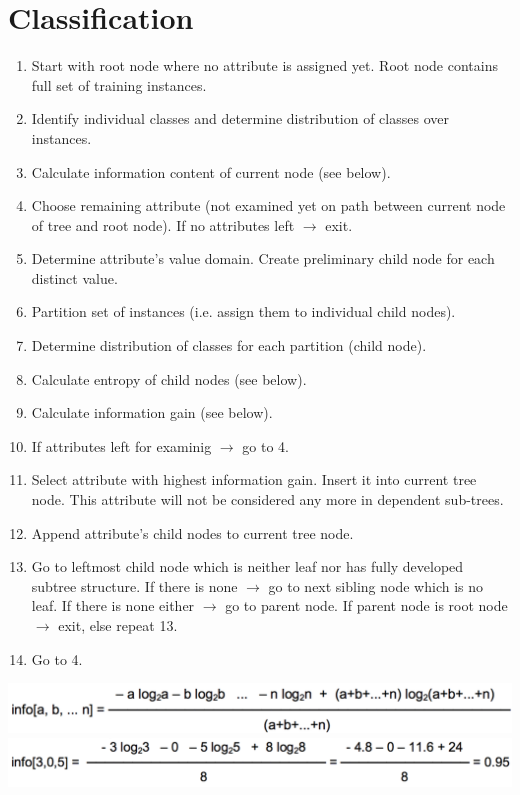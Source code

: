 
\section{Classification}

\begin{breakbox}
\begin{enumerate}
	\item Start with root node where no attribute is assigned yet. Root node contains full set of training instances.
	\item Identify individual classes and determine distribution of classes over instances.
	\item Calculate information content of current node (see below).
	\item Choose remaining attribute (not examined yet on path between current node of tree and root node). If no attributes left $\rightarrow$ exit.
	\item Determine attribute's value domain. Create preliminary child node for each distinct value.
	\item Partition set of instances (i.e. assign them to individual child nodes).
	\item Determine distribution of classes for each partition (child node).
	\item Calculate entropy of child nodes (see below).
	\item Calculate information gain (see below).
	\item If attributes left for examinig $\rightarrow$ go to 4.
	\item Select attribute with highest information gain. Insert it into current tree node. This attribute will not be considered any more in dependent sub-trees.
	\item Append attribute's child nodes to current tree node.
	\item Go to leftmost child node which is neither leaf nor has fully developed subtree structure. If there is none $\rightarrow$ go to next sibling node which is no leaf. If there is none either $\rightarrow$ go to parent node. If parent node is root node $\rightarrow$ exit, else repeat 13.
	\item Go to 4.
\end{enumerate}

\begin{breakbox}
\begin{center}
\includegraphics[width=.15\textwidth]{slides_images/information_content}
\includegraphics[width=.15\textwidth]{slides_images/information_content_example}
\end{center}
\end{breakbox}


\end{breakbox}
